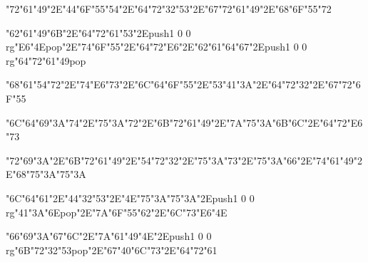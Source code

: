 \vfill\eject
\null\vfill
\centerline{\ipa\char"72\ipa\char"61\ipa\char"49\ipa\char"2E\ipa\char"44\ipa\char"6F\ipa\char"55\ipa\char"54\ipa\char"2E\ipa\char"64\ipa\char"72\ipa\char"32\ipa\char"53\ipa\char"2E\ipa\char"67\ipa\char"72\ipa\char"61\ipa\char"49\ipa\char"2E\ipa\char"68\ipa\char"6F\ipa\char"55\ipa\char"72}\bigskip
\centerline{\ipa\char"62\ipa\char"61\ipa\char"49\ipa\char"6B\ipa\char"2E\ipa\char"64\ipa\char"72\ipa\char"61\ipa\char"53\ipa\char"2E\pdfcolorstack\match push{1 0 0 rg}\ipa\char"E6\ipa\char"4E\pdfcolorstack\match pop{}\ipa\char"2E\ipa\char"74\ipa\char"6F\ipa\char"55\ipa\char"2E\ipa\char"64\ipa\char"72\ipa\char"E6\ipa\char"2E\ipa\char"62\ipa\char"61\ipa\char"64\ipa\char"67\ipa\char"2E\pdfcolorstack\match push{1 0 0 rg}\ipa\char"64\ipa\char"72\ipa\char"61\ipa\char"49\pdfcolorstack\match pop{}}\bigskip
\centerline{\ipa\char"68\ipa\char"61\ipa\char"54\ipa\char"72\ipa\char"2E\ipa\char"74\ipa\char"E6\ipa\char"73\ipa\char"2E\ipa\char"6C\ipa\char"64\ipa\char"6F\ipa\char"55\ipa\char"2E\ipa\char"53\ipa\char"41\ipa\char"3A\ipa\char"2E\ipa\char"64\ipa\char"72\ipa\char"32\ipa\char"2E\ipa\char"67\ipa\char"72\ipa\char"6F\ipa\char"55}
\vfill\eject
\null\vfill
\centerline{\ipa\char"6C\ipa\char"64\ipa\char"69\ipa\char"3A\ipa\char"74\ipa\char"2E\ipa\char"75\ipa\char"3A\ipa\char"72\ipa\char"2E\ipa\char"6B\ipa\char"72\ipa\char"61\ipa\char"49\ipa\char"2E\ipa\char"7A\ipa\char"75\ipa\char"3A\ipa\char"6B\ipa\char"6C\ipa\char"2E\ipa\char"64\ipa\char"72\ipa\char"E6\ipa\char"73}\bigskip
\centerline{\ipa\char"72\ipa\char"69\ipa\char"3A\ipa\char"2E\ipa\char"6B\ipa\char"72\ipa\char"61\ipa\char"49\ipa\char"2E\ipa\char"54\ipa\char"72\ipa\char"32\ipa\char"2E\ipa\char"75\ipa\char"3A\ipa\char"73\ipa\char"2E\ipa\char"75\ipa\char"3A\ipa\char"66\ipa\char"2E\ipa\char"74\ipa\char"61\ipa\char"49\ipa\char"2E\ipa\char"68\ipa\char"75\ipa\char"3A\ipa\char"75\ipa\char"3A}\bigskip
\centerline{\ipa\char"6C\ipa\char"64\ipa\char"61\ipa\char"2E\ipa\char"44\ipa\char"32\ipa\char"53\ipa\char"2E\ipa\char"4E\ipa\char"75\ipa\char"3A\ipa\char"75\ipa\char"3A\ipa\char"2E\pdfcolorstack\match push{1 0 0 rg}\ipa\char"41\ipa\char"3A\ipa\char"6E\pdfcolorstack\match pop{}\ipa\char"2E\ipa\char"7A\ipa\char"6F\ipa\char"55\ipa\char"62\ipa\char"2E\ipa\char"6C\ipa\char"73\ipa\char"E6\ipa\char"4E}
\vfill\eject
\null\vfill
\centerline{\ipa\char"66\ipa\char"69\ipa\char"3A\ipa\char"67\ipa\char"6C\ipa\char"2E\ipa\char"7A\ipa\char"61\ipa\char"49\ipa\char"4E\ipa\char"2E\pdfcolorstack\match push{1 0 0 rg}\ipa\char"6B\ipa\char"72\ipa\char"32\ipa\char"53\pdfcolorstack\match pop{}\ipa\char"2E\ipa\char"67\ipa\char"40\ipa\char"6C\ipa\char"73\ipa\char"2E\ipa\char"64\ipa\char"72\ipa\char"61}\bigskip
